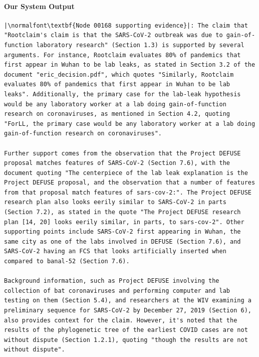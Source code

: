 \documentclass{article}
\begin{document}
\paragraph{Our System Output}
\begin{lstlisting}
|\normalfont\textbf{Node 00168 supporting evidence}|: The claim that "Rootclaim's claim is that the SARS-CoV-2 outbreak was due to gain-of-function laboratory research" (Section 1.3) is supported by several arguments. For instance, Rootclaim evaluates 80% of pandemics that first appear in Wuhan to be lab leaks, as stated in Section 3.2 of the document "eric_decision.pdf", which quotes "Similarly, Rootclaim evaluates 80% of pandemics that first appear in Wuhan to be lab leaks". Additionally, the primary case for the lab-leak hypothesis would be any laboratory worker at a lab doing gain-of-function research on coronaviruses, as mentioned in Section 4.2, quoting "ForLL, the primary case would be any laboratory worker at a lab doing gain-of-function research on coronaviruses".

Further support comes from the observation that the Project DEFUSE proposal matches features of SARS-CoV-2 (Section 7.6), with the document quoting "The centerpiece of the lab leak explanation is the Project DEFUSE proposal, and the observation that a number of features from that proposal match features of sars-cov-2:". The Project DEFUSE research plan also looks eerily similar to SARS-CoV-2 in parts (Section 7.2), as stated in the quote "The Project DEFUSE research plan [14, 20] looks eerily similar, in parts, to sars-cov-2". Other supporting points include SARS-CoV-2 first appearing in Wuhan, the same city as one of the labs involved in DEFUSE (Section 7.6), and SARS-CoV-2 having an FCS that looks artificially inserted when compared to banal-52 (Section 7.6).

Background information, such as Project DEFUSE involving the collection of bat coronaviruses and performing computer and lab testing on them (Section 5.4), and researchers at the WIV examining a preliminary sequence for SARS-CoV-2 by December 27, 2019 (Section 6), also provides context for the claim. However, it's noted that the results of the phylogenetic tree of the earliest COVID cases are not without dispute (Section 1.2.1), quoting "though the results are not without dispute".


\end{lstlisting}
\end{document}
